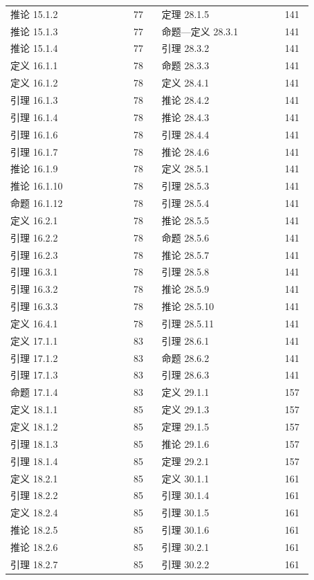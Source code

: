 \documentclass[UTF8,10pt,fontset=windows]{ctexart}
\begin{document}
{\begin{longtable}{@{}p{0.355\linewidth}p{0.085\linewidth}p{0.355\linewidth}p{0.085\linewidth}@{}}
推论 15.1.2 & 77 & 定理 28.1.5 & 141 \\
推论 15.1.3 & 77 & 命题—定义 28.3.1 & 141 \\
推论 15.1.4 & 77 & 引理 28.3.2 & 141 \\
定义 16.1.1 & 78 & 命题 28.3.3 & 141 \\
定义 16.1.2 & 78 & 定义 28.4.1 & 141 \\
引理 16.1.3 & 78 & 推论 28.4.2 & 141 \\
引理 16.1.4 & 78 & 推论 28.4.3 & 141 \\
引理 16.1.6 & 78 & 引理 28.4.4 & 141 \\
引理 16.1.7 & 78 & 推论 28.4.6 & 141 \\
推论 16.1.9 & 78 & 定义 28.5.1 & 141 \\
推论 16.1.10 & 78 & 引理 28.5.3 & 141 \\
命题 16.1.12 & 78 & 引理 28.5.4 & 141 \\
定义 16.2.1 & 78 & 推论 28.5.5 & 141 \\
引理 16.2.2 & 78 & 命题 28.5.6 & 141 \\
引理 16.2.3 & 78 & 推论 28.5.7 & 141 \\
引理 16.3.1 & 78 & 引理 28.5.8 & 141 \\
引理 16.3.2 & 78 & 推论 28.5.9 & 141 \\
引理 16.3.3 & 78 & 推论 28.5.10 & 141 \\
定义 16.4.1 & 78 & 引理 28.5.11 & 141 \\
定义 17.1.1 & 83 & 引理 28.6.1 & 141 \\
引理 17.1.2 & 83 & 命题 28.6.2 & 141 \\
引理 17.1.3 & 83 & 引理 28.6.3 & 141 \\
命题 17.1.4 & 83 & 定义 29.1.1 & 157 \\
定义 18.1.1 & 85 & 定义 29.1.3 & 157 \\
定义 18.1.2 & 85 & 定理 29.1.5 & 157 \\
引理 18.1.3 & 85 & 推论 29.1.6 & 157 \\
引理 18.1.4 & 85 & 定理 29.2.1 & 157 \\
定义 18.2.1 & 85 & 定义 30.1.1 & 161 \\
引理 18.2.2 & 85 & 引理 30.1.4 & 161 \\
定义 18.2.4 & 85 & 引理 30.1.5 & 161 \\
推论 18.2.5 & 85 & 引理 30.1.6 & 161 \\
推论 18.2.6 & 85 & 引理 30.2.1 & 161 \\
引理 18.2.7 & 85 & 引理 30.2.2 & 161 \\

\end{longtable}}
\end{document}
